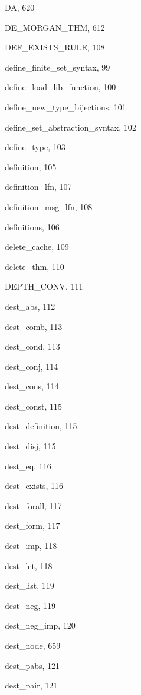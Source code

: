 \begin{theindex}
  \indexspace

  \item {\ptt DA}, 620
  \item {\ptt DE\_MORGAN\_THM}, 612
  \item {\ptt DEF\_EXISTS\_RULE}, 108
  \item {\ptt define\_finite\_set\_syntax}, 99
  \item {\ptt define\_load\_lib\_function}, 100
  \item {\ptt define\_new\_type\_bijections}, 101
  \item {\ptt define\_set\_abstraction\_syntax}, 102
  \item {\ptt define\_type}, 103
  \item {\ptt definition}, 105
  \item {\ptt definition\_lfn}, 107
  \item {\ptt definition\_msg\_lfn}, 108
  \item {\ptt definitions}, 106
  \item {\ptt delete\_cache}, 109
  \item {\ptt delete\_thm}, 110
  \item {\ptt DEPTH\_CONV}, 111
  \item {\ptt dest\_abs}, 112
  \item {\ptt dest\_comb}, 113
  \item {\ptt dest\_cond}, 113
  \item {\ptt dest\_conj}, 114
  \item {\ptt dest\_cons}, 114
  \item {\ptt dest\_const}, 115
  \item {\ptt dest\_definition}, 115
  \item {\ptt dest\_disj}, 115
  \item {\ptt dest\_eq}, 116
  \item {\ptt dest\_exists}, 116
  \item {\ptt dest\_forall}, 117
  \item {\ptt dest\_form}, 117
  \item {\ptt dest\_imp}, 118
  \item {\ptt dest\_let}, 118
  \item {\ptt dest\_list}, 119
  \item {\ptt dest\_neg}, 119
  \item {\ptt dest\_neg\_imp}, 120
  \item {\ptt dest\_node}, 659
  \item {\ptt dest\_pabs}, 121
  \item {\ptt dest\_pair}, 121

\end{theindex}
